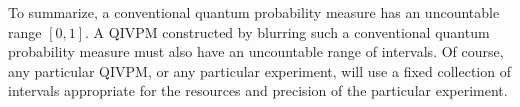 \documentclass[english,reprint, aps, prl,superscriptaddress, showpacs,
showkeys, longbibliography, amsmath, amssymb, floatfix]{revtex4-1}
\theoremstyle{plain}
\theoremstyle{definition}
\newcommand{\imposs}{\textbf{\textsf{F}}}
\newcommand{\necess}{\textbf{\textsf{T}}}
\newcommand{\proj}[1]{\op{#1}{#1}}
\newcommand{\ultramodular}{\mathcal{M}}
\newcommand{\muB}{\ensuremath{\mu^{B}}}
\newcommand{\says}[3]{\begin{framed}\begin{minipage}{0.9\linewidth}\color{#1}{#2 says: #3}\end{minipage}\end{framed}}
\newcommand{\gerardo}[1]{\says{OliveGreen}{Gerardo}{#1}}
\begin{document}
To summarize, a conventional quantum probability measure has an
uncountable range $[0,1]$. A QIVPM constructed by blurring such a
conventional quantum probability measure must also have an uncountable
range of intervals. Of course, any particular QIVPM, or any particular
experiment, will use a fixed collection of intervals appropriate for
the resources and precision of the particular experiment. 
\end{document}
